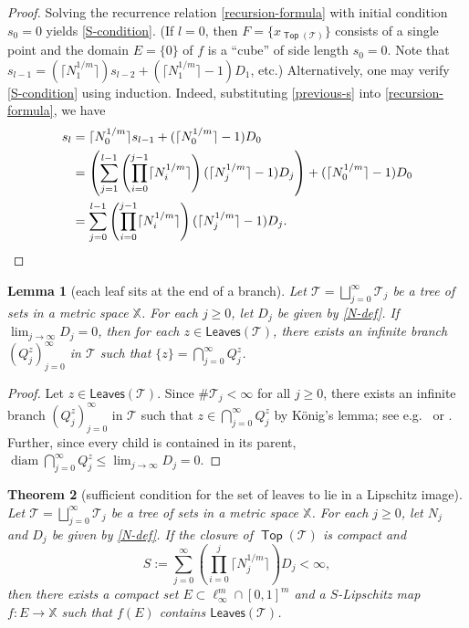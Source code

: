 \documentclass[12pt]{amsart}
\newtheorem{theorem}{Theorem}[section]
\newtheorem{lemma}[theorem]{Lemma}
\theoremstyle{definition}
\theoremstyle{remark}
\newcommand{\XX}{\mathbb{X}}
\newcommand{\diam}{\mathop\mathrm{diam}\nolimits}
\newcommand{\leaves}{\mathsf{Leaves}}
\newcommand{\Top}{\mathop\mathsf{Top}}
\numberwithin{figure}{section}
\numberwithin{equation}{section}
\begin{document}
\begin{proof}
Solving the recurrence relation \eqref{recursion-formula} with initial condition $s_0=0$ yields \eqref{S-condition}. (If $l=0$, then $F=\{x_{\Top(\mathcal{T})}\}$ consists of a single point and the domain $E=\{0\}$ of $f$ is a ``cube'' of side length $s_0=0$. Note that $s_{l-1}=(\lceil N_1^{1/m}\rceil)s_{l-2}+(\lceil N_1^{1/m}\rceil-1) D_1$, etc.) Alternatively, one may verify \eqref{S-condition} using induction. Indeed, substituting \eqref{previous-s} into \eqref{recursion-formula}, we have \begin{align*}
s_l&= \lceil N_0^{1/m}\rceil s_{l-1}+(\lceil N_0^{1/m}\rceil-1) D_0\\
&=\left(\sum_{j=1}^{l-1}\left(\prod_{i=0}^{j-1}
\lceil N_{i}^{1/m}\rceil\right) (\lceil N_j^{1/m}\rceil -1)D_j\right)+(\lceil N_0^{1/m}\rceil-1)D_0\\
&=\sum_{j=0}^{l-1}\left(\prod_{i=0}^{j-1} \lceil N_i^{1/m}\rceil\right) (\lceil N_j^{1/m}\rceil-1)D_j. \qedhere\end{align*}\end{proof}

\begin{lemma}[each leaf sits at the end of a branch] \label{l:branch} Let $\mathcal{T}=\bigsqcup_{j=0}^\infty\mathcal{T}_j$ be a tree of sets in a metric space $\XX$. For each $j\geq 0$, let $D_j$ be given by \eqref{N-def}. If $\lim_{j\rightarrow\infty} D_j=0$, then for each $z\in\leaves(\mathcal{T})$, there exists an infinite branch $(Q_j^z)_{j=0}^\infty$ in $\mathcal{T}$ such that $\{z\}=\bigcap_{j=0}^\infty Q_j^z$. \end{lemma}

\begin{proof} Let $z\in\leaves(\mathcal{T})$. Since $\#\mathcal{T}_j<\infty$ for all $j\geq 0$, there exists an infinite branch $(Q_j^z)_{j=0}^\infty$ in $\mathcal{T}$ such that $z\in\bigcap_{j=0}^\infty Q_j^z$ by K\"onig's lemma; see e.g.~\cite{Konig-history} or \cite[p.~190]{DST}. Further, since every child is contained in its parent, $\diam\bigcap_{j=0}^\infty Q_j^z \leq \lim_{j\rightarrow\infty} D_j=0$.\end{proof}

\begin{theorem}[sufficient condition for the set of leaves to lie in a Lipschitz image] \label{t:pack} Let $\mathcal{T}=\bigsqcup_{j=0}^\infty\mathcal{T}_j$ be a tree of sets in a metric space $\XX$. For each $j\geq 0$, let $N_j$ and $D_j$ be given by \eqref{N-def}. If the closure of $\Top(\mathcal{T})$ is compact and \begin{equation}\label{root-condition} S:=\sum_{j=0}^\infty \left(\prod_{i=0}^j \lceil N_{j}^{1/m}\rceil \right) D_j<\infty,\end{equation} then there exists a compact set $E\subset \ell^m_\infty\cap [0,1]^m$ and a $S$-Lipschitz map $f:E\rightarrow\XX$ such that $f(E)$ contains $\leaves(\mathcal{T})$.\end{theorem}
\end{document}
